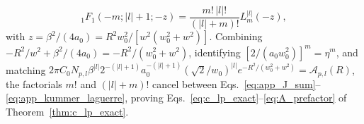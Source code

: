 \documentclass[aps,pra,onecolumn,notitlepage,11pt,tightenlines,amsmath,amssymb,floatfix,longbibliography]{revtex4-2}
\providecommand{\abs}[1]{\lvert#1\rvert}
\begin{document}
\begin{equation}
{_1F_1}(-m; \abs{l}+1; -z) = \frac{m!\,\abs{l}!}{(\abs{l}+m)!} L_m^{\abs{l}}(-z),
\label{eq:app_kummer_laguerre}
\end{equation}
with $z = \beta^2/(4a_0) = R^2 w_0^2/[w^2(w_0^2+w^2)]$. Combining $-R^2/w^2 + \beta^2/(4a_0) = -R^2/(w_0^2 + w^2)$, identifying $[2/(a_0 w_0^2)]^m = \eta^m$, and matching $2\pi C_0 N_{p,l}\beta^{\abs{l}} 2^{-(\abs{l}+1)} a_0^{-(\abs{l}+1)} (\sqrt{2}/w_0)^{\abs{l}} e^{-R^2/(w_0^2+w^2)} = \mathcal{A}_{p,l}(R)$, the factorials $m!$ and $(\abs{l}+m)!$ cancel between Eqs.~\eqref{eq:app_J_sum}--\eqref{eq:app_kummer_laguerre}, proving Eqs.~\eqref{eq:c_lp_exact}--\eqref{eq:A_prefactor} of Theorem~\ref{thm:c_lp_exact}.


\end{document}
